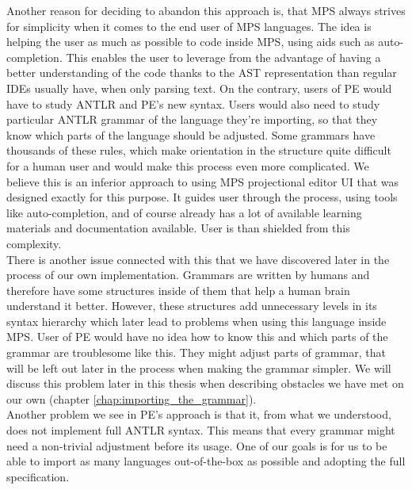 Another reason for deciding to abandon this approach is, that MPS always strives for simplicity when it comes to the end user of MPS languages. The idea is helping the user as much as possible to code inside MPS, using aids such as auto-completion. This enables the user to leverage from the advantage of having a better understanding of the code thanks to the AST representation than regular IDEs usually have, when only parsing text. On the contrary, users of PE would have to study ANTLR and PE's new syntax. Users would also need to study particular ANTLR grammar of the language they're importing, so that they know which parts of the language should be adjusted. Some grammars have thousands of these rules, which make orientation in the structure quite difficult for a human user and would make this process even more complicated. We believe this is an inferior approach to using MPS projectional editor UI that was designed exactly for this purpose. It guides user through the process, using tools like auto-completion, and of course already has a lot of available learning materials and documentation available. User is than shielded from this complexity.
\\

There is another issue connected with this that we have discovered later in the process of our own implementation. Grammars are written by humans and therefore have some structures inside of them that help a human brain understand it better. However, these structures add unnecessary levels in its syntax hierarchy which later lead to problems when using this language inside MPS. User of PE would have no idea how to know this and which parts of the grammar are troublesome like this. They might adjust parts of grammar, that will be left out later in the process when making the grammar simpler. We will discuss this problem later in this thesis when describing obstacles we have met on our own (chapter \ref{chap:importing_the_grammar}).
\\

Another problem we see in PE's approach is that it, from what we understood, does not implement full ANTLR syntax. This means that every grammar might need a non-trivial adjustment before its usage. One of our goals is for us to be able to import as many languages out-of-the-box as possible and adopting the full specification.
\\

